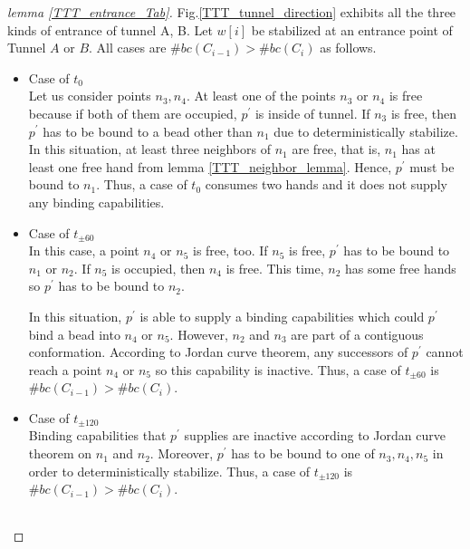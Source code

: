 \documentclass[runningheads]{llncs}
\begin{document}
\begin{proof}[lemma \ref{TTT_entrance_Tab}]
Fig.\ref{TTT_tunnel_direction} exhibits all the three kinds of entrance of tunnel A, B.
Let $w[i]$ be stabilized at an entrance point of Tunnel $A$ or $B$.
All cases are $\#bc(C_{i-1}) > \#bc(C_{i})$ as follows.


\begin{itemize}
\item{Case of $t_0$}\\
  Let us consider points $n_3,n_4$. At least one of the points $n_3$ or $n_4$ is free because if both of them are occupied, $p^\prime$ is inside of tunnel. If $n_3$ is free, then $p^\prime$ has to be bound to a bead other than $n_1$ due to deterministically stabilize. In this situation, at least three neighbors of $n_1$ are free, that is, $n_1$ has at least one free hand from lemma \ref{TTT_neighbor_lemma}. Hence, $p^\prime$ must be bound to $n_1$. Thus, a case of $t_0$ consumes two hands and it does not supply any binding capabilities.

\item{Case of $t_{\pm 60}$}\\
  In this case, a point $n_4$ or $n_5$ is free, too. If $n_5$ is free, $p^\prime$ has to be bound to $n_1$ or $n_2$. If $n_5$ is occupied, then $n_4$ is free. This time, $n_2$ has some free hands so $p^\prime$ has to be bound to $n_2$.
  

  In this situation, $p^\prime$ is able to supply a binding capabilities which could $p^\prime$ bind a bead into $n_4$ or $n_5$. However, $n_2$ and $n_3$ are part of a contiguous conformation. According to Jordan curve theorem, any successors of $p^\prime$ cannot reach a point $n_4$ or $n_5$ so this capability is inactive. Thus, a case of $t_{\pm 60}$ is$\#bc(C_{i-1}) > \#bc(C_{i})$.

\item{Case of $t_{\pm 120}$}\\
  Binding capabilities that $p^\prime$ supplies are inactive according to Jordan curve theorem on $n_1$ and $n_2$. Moreover, $p^\prime$ has to be bound to one of $n_3, n_4, n_5$ in order to deterministically stabilize.
Thus, a case of $t_{\pm 120}$ is $\#bc(C_{i-1}) > \#bc(C_{i})$.
  
\end{itemize}

\begin{figure}
  \begin{center}
    \begin{tabular}{ccc}
    

\end{tabular}
\end{center}
\end{figure}
\end{proof}
\end{document}
